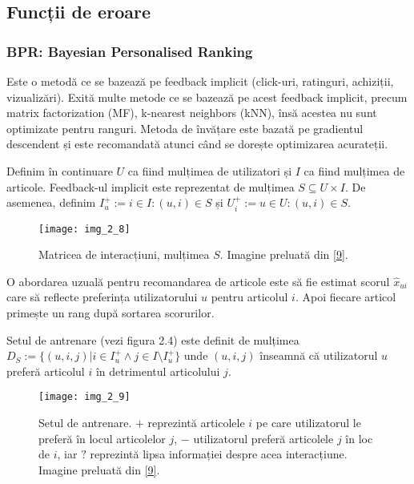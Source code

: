 \subsection{Funcții de eroare}

\subsubsection*{BPR: Bayesian Personalised Ranking}

Este o metodă ce se bazează pe feedback implicit (click-uri, ratinguri, achiziții, vizualizări). Exită multe metode ce se bazează pe acest feedback implicit, precum matrix factorization (MF), k-nearest neighbors (kNN), însă acestea nu sunt optimizate pentru ranguri. Metoda de învățare este bazată pe gradientul descendent și este recomandată atunci când se dorește optimizarea acurateții.

Definim în continuare $U$ ca fiind mulțimea de utilizatori și $I$ ca fiind mulțimea de articole. Feedback-ul implicit este reprezentat de mulțimea $S \subseteq U \times I$. De asemenea, definim $I_u^+ := {i \in I:(u, i) \in S}$ și $U_i^+ := {u \in U:(u, i) \in S}$.
\begin{figure}[!h]
	\centering
	\texttt{[image: img\_2\_8]}
	\caption[Matricea de interacțiuni]{Matricea de interacțiuni, mulțimea $S$. Imagine preluată din \hyperlink{SteffenRendleChristophFreudenthalerZenoGantnerLarsSchmidtThieme}{[9]}.}
\end{figure} 

O abordarea uzuală pentru recomandarea de articole este să fie estimat scorul $\hat{x}_{ui}$ care să reflecte preferința utilizatorului $u$ pentru articolul $i$. Apoi fiecare articol primește un rang după sortarea scorurilor.

Setul de antrenare (vezi figura 2.4) este definit de mulțimea $D_S := \{(u,i,j)|i \in I_u^+ \wedge j \in I \setminus I_u^+\}$ unde $(u,i,j)$ înseamnă că utilizatorul $u$ preferă articolul $i$ în detrimentul articolului $j$.
\begin{figure}[!h]
	\centering
	\texttt{[image: img\_2\_9]}
	\caption[Setul de antrenare]{Setul de antrenare. $+$ reprezintă articolele $i$ pe care utilizatorul le preferă în locul articolelor $j$, $-$ utilizatorul preferă articolele $j$ în loc de $i$, iar $?$ reprezintă lipsa informației despre acea interacțiune. Imagine preluată din \hyperlink{SteffenRendleChristophFreudenthalerZenoGantnerLarsSchmidtThieme}{[9]}.}
\end{figure} 

